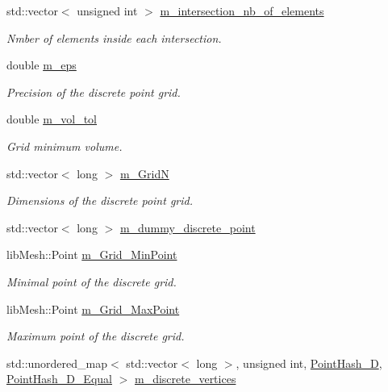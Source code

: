 \begin{DoxyCompactItemize}
std\+::vector$<$ unsigned int $>$ \hyperlink{classcarl_1_1_stitch___meshes_a5548b4e0628dcdcb5b1c08eeec124c39}{m\+\_\+intersection\+\_\+nb\+\_\+of\+\_\+elements}
\begin{DoxyCompactList}\small\item\em Nmber of elements inside each intersection. \end{DoxyCompactList}\item 
double \hyperlink{classcarl_1_1_stitch___meshes_a1cbb52478197125ed915538dc9c717c2}{m\+\_\+eps}
\begin{DoxyCompactList}\small\item\em Precision of the discrete point grid. \end{DoxyCompactList}\item 
double \hyperlink{classcarl_1_1_stitch___meshes_a6c5e1728cc1118b1052f78f87c560c91}{m\+\_\+vol\+\_\+tol}
\begin{DoxyCompactList}\small\item\em Grid minimum volume. \end{DoxyCompactList}\item 
std\+::vector$<$ long $>$ \hyperlink{classcarl_1_1_stitch___meshes_a4213e0cfdaf9554971d75c6b811f4bdd}{m\+\_\+\+Grid\+N}
\begin{DoxyCompactList}\small\item\em Dimensions of the discrete point grid. \end{DoxyCompactList}\item 
std\+::vector$<$ long $>$ \hyperlink{classcarl_1_1_stitch___meshes_a254b2b118a6bcabe7ebeeee083f03a9a}{m\+\_\+dummy\+\_\+discrete\+\_\+point}
\item 
lib\+Mesh\+::\+Point \hyperlink{classcarl_1_1_stitch___meshes_a7bf918ef98a9bc853afe749c44d35f35}{m\+\_\+\+Grid\+\_\+\+Min\+Point}
\begin{DoxyCompactList}\small\item\em Minimal point of the discrete grid. \end{DoxyCompactList}\item 
lib\+Mesh\+::\+Point \hyperlink{classcarl_1_1_stitch___meshes_a06ac179f70188b5fed34f32e88a37787}{m\+\_\+\+Grid\+\_\+\+Max\+Point}
\begin{DoxyCompactList}\small\item\em Maximum point of the discrete grid. \end{DoxyCompactList}\item 
std\+::unordered\+\_\+map$<$ std\+::vector$<$ long $>$, unsigned int, \hyperlink{structcarl_1_1_point_hash__3_d}{Point\+Hash\+\_\+D}, \hyperlink{structcarl_1_1_point_hash__3_d___equal}{Point\+Hash\+\_\+D\+\_\+\+Equal} $>$ \hyperlink{classcarl_1_1_stitch___meshes_a3fa40b0605f44524589a60be157a8a87}{m\+\_\+discrete\+\_\+vertices}

\end{DoxyCompactItemize}
